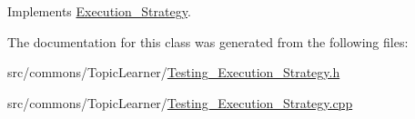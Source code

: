 Implements \hyperlink{class_execution___strategy_a62fc15af296f2f27f44848eb56aa3ff9}{Execution\_\-Strategy}.



The documentation for this class was generated from the following files:\begin{DoxyCompactItemize}
\item 
src/commons/TopicLearner/\hyperlink{_testing___execution___strategy_8h}{Testing\_\-Execution\_\-Strategy.h}\item 
src/commons/TopicLearner/\hyperlink{_testing___execution___strategy_8cpp}{Testing\_\-Execution\_\-Strategy.cpp}\end{DoxyCompactItemize}
